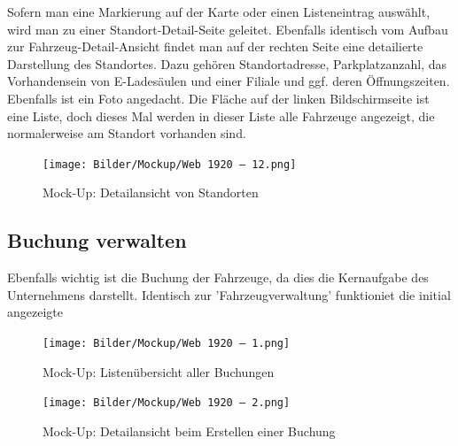 Sofern man eine Markierung auf der Karte oder einen Listeneintrag auswählt, wird man zu einer Standort-Detail-Seite geleitet. Ebenfalls identisch vom Aufbau zur Fahrzeug-Detail-Ansicht findet man auf der rechten Seite eine detailierte Darstellung des Standortes. Dazu gehören Standortadresse, Parkplatzanzahl, das Vorhandensein von E-Ladesäulen und einer Filiale und ggf. deren Öffnungszeiten. Ebenfalls ist ein Foto angedacht. Die Fläche auf der linken Bildschirmseite ist eine Liste, doch dieses Mal werden in dieser Liste alle Fahrzeuge angezeigt, die normalerweise am Standort vorhanden sind.  

\begin{figure}[!ht]
    \centering
    \texttt{[image: Bilder/Mockup/Web 1920 – 12.png]}
    \caption{Mock-Up: Detailansicht von Standorten}
    \label{mu:standortdetails}
\end{figure}

\newpage

\subsection{Buchung verwalten}

Ebenfalls wichtig ist die Buchung der Fahrzeuge, da dies die Kernaufgabe des Unternehmens darstellt. 
Identisch zur 'Fahrzeugverwaltung' funktioniet die initial angezeigte 

\begin{figure}[!ht]
    \centering
    \texttt{[image: Bilder/Mockup/Web 1920 – 1.png]}
    \caption{Mock-Up: Listenübersicht aller Buchungen}
    \label{mu:buchung_verwalten}
\end{figure}

\begin{figure}[!ht]
    \centering
    \texttt{[image: Bilder/Mockup/Web 1920 – 2.png]}
    \caption{Mock-Up: Detailansicht beim Erstellen einer Buchung}
    \label{mu:buchung_anlegen}
\end{figure}
